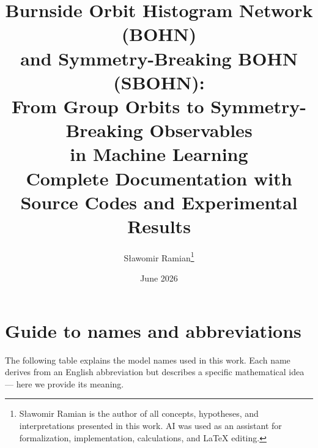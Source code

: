 \documentclass[11pt,a4paper]{report}
\title{\textbf{Burnside Orbit Histogram Network (BOHN)\\
and Symmetry-Breaking BOHN (SBOHN):\\
From Group Orbits to Symmetry-Breaking Observables\\in Machine Learning}\\[6pt]
\large Complete Documentation with Source Codes and Experimental Results}
\author{S{\l}awomir Ramian\footnote{S{\l}awomir Ramian is the author of all concepts, hypotheses, and interpretations presented in this work. AI was used as an assistant for formalization, implementation, calculations, and \LaTeX{} editing.}}
\date{June 2026}
\begin{document}
\maketitle
\tableofcontents
\newpage


\chapter*{Guide to names and abbreviations}

The following table explains the model names used in this work. Each name derives from an English abbreviation but describes a specific mathematical idea --- here we provide its meaning.
\end{document}
